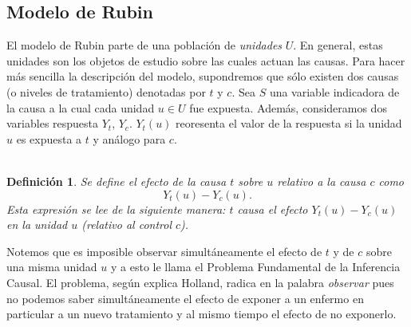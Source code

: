 \documentclass[11pt]{article}
\theoremstyle{plain}
\newtheorem{defi}[teo]{Definición}
\begin{document}
\subsection{Modelo de Rubin}
El modelo de Rubin parte de una población de \textit{unidades} $U$. En general, estas unidades son los objetos de estudio sobre las cuales actuan las causas. Para hacer más sencilla la descripción del modelo, supondremos que sólo existen dos causas (o niveles de tratamiento) denotadas por $t$ y $c$. Sea $S$ una variable indicadora de la causa a la cual cada unidad $u \in U$ fue expuesta. Además, consideramos dos variables respuesta $Y_t$, $Y_c$. $Y_t(u)$ reoresenta el valor de la respuesta si la unidad $u$ es expuesta a $t$ y análogo para $c$.\\
\\
\begin{defi}
Se define el efecto de la causa $t$ sobre $u$ relativo a la causa $c$ como
\[ Y_t(u) - Y_c(u). \]
Esta expresión se lee de la siguiente manera: $t$ causa el efecto $Y_t(u) - Y_c(u)$ en la unidad $u$ (relativo al control $c$).
\end{defi}
Notemos que es imposible observar simultáneamente el efecto de $t$ y de $c$ sobre una misma unidad $u$ y a esto \cite{holland1986statistics} le llama el Problema Fundamental de la Inferencia Causal. El problema, según explica Holland, radica en la palabra \textit{observar} pues no podemos saber simultáneamente el efecto de exponer a un enfermo en particular a un nuevo tratamiento y al mismo tiempo el efecto de no exponerlo.
\end{document}
